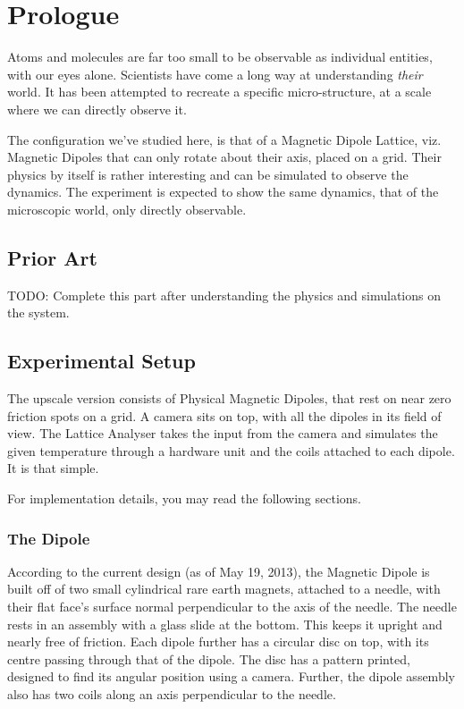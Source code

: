 \chapter{Prologue}
	Atoms and molecules are far too small to be observable as individual entities, with our eyes alone. Scientists have come a long way at understanding \emph{their} world. It has been attempted to recreate a specific micro-structure, at a scale where we can directly observe it.
	\par
	The configuration we've studied here, is that of a Magnetic Dipole Lattice, viz. Magnetic Dipoles that can only rotate about their axis, placed on a grid. Their physics by itself is rather interesting and can be simulated to observe the dynamics. The experiment is expected to show the same dynamics, that of the microscopic world, only directly observable.

\section{Prior Art}
	TODO: Complete this part after understanding the physics and simulations on the system.

\section{Experimental Setup}
	The upscale version consists of Physical Magnetic Dipoles, that rest on near zero friction spots on a grid. A camera sits on top, with all the dipoles in its field of view. The Lattice Analyser takes the input from the camera and simulates the given temperature through a hardware unit and the coils attached to each dipole. It is that simple.
	\par
	For implementation details, you may read the following sections.
	\subsection{The Dipole}
		According to the current design (as of May 19, 2013), the Magnetic Dipole is built off of two small cylindrical rare earth magnets, attached to a needle,  with their flat face's surface normal perpendicular to the axis of the needle. The needle rests in an assembly with a glass slide at the bottom. This keeps it upright and nearly free of friction. Each dipole further has a circular disc on top, with its centre passing through that of the dipole. The disc has a pattern printed, designed to find its angular position using a camera. Further, the dipole assembly also has two coils along an axis perpendicular to the needle.
